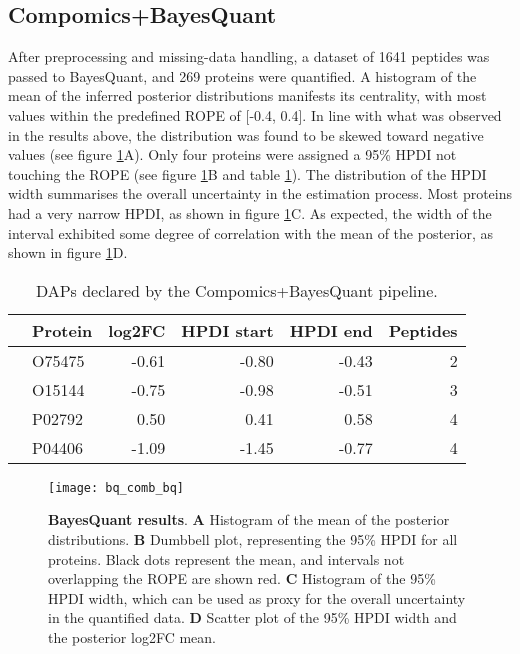 \subsection{Compomics+BayesQuant}

After preprocessing and missing-data handling, a dataset of 1641 peptides was passed to BayesQuant, and 269 proteins were quantified. A histogram of the mean of the inferred posterior distributions manifests its centrality, with most values within the predefined \ac{ROPE} of [-0.4, 0.4]. In line with what was observed in the results above, the distribution was found to be skewed toward negative values (see figure \ref{fig:compomics_bq}A). Only four proteins were assigned a 95\% \ac{HPDI} not touching the \ac{ROPE} (see figure \ref{fig:compomics_bq}B and table \ref{tab:thp1_bq_results}). The distribution of the \ac{HPDI} width summarises the overall uncertainty in the estimation process. Most proteins had a very narrow HPDI, as shown in figure \ref{fig:compomics_bq}C. As expected, the width of the interval exhibited some degree of correlation with the mean of the posterior, as shown in figure \ref{fig:compomics_bq}D.

\begin{table}[!h]
\centering
\begin{tabular}{rlrrrr}
  \hline
 & Protein & log2FC & HPDI start & HPDI end & Peptides \\ 
  \hline
& O75475 & -0.61 & -0.80 & -0.43 & 2 \\ 
   & O15144 & -0.75 & -0.98 & -0.51 & 3 \\ 
   & P02792 & 0.50 & 0.41 & 0.58 & 4 \\ 
   & P04406 & -1.09 & -1.45 & -0.77 & 4 \\ 
   \hline
\end{tabular}
\caption{\ac{DAP}s declared by the Compomics+BayesQuant pipeline.}
\label{tab:thp1_bq_results}
\end{table}


\begin{figure}[H]
\centering
\texttt{[image: bq\_comb\_bq]}
\caption[Compomics+BayesQuant results on the THP-1 dataset]{\textbf{BayesQuant results}. \textbf{A} Histogram of the mean of the posterior distributions. \textbf{B} Dumbbell plot, representing the 95\% \ac{HPDI} for all proteins. Black dots represent the mean, and intervals not overlapping the \ac{ROPE} are shown red. \textbf{C} Histogram of the 95\% \ac{HPDI} width, which can be used as proxy for the overall uncertainty in the quantified data. \textbf{D} Scatter plot of the 95\% \ac{HPDI} width and the  posterior \ac{log2FC} mean.}
\label{fig:compomics_bq}
\end{figure}


